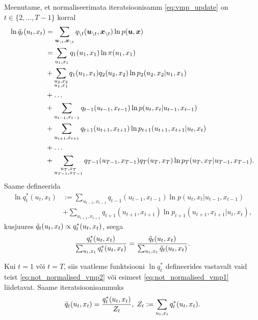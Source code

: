Meenutame, et normaliseerimata iteratsioonisamm \eqref{eq:vmp_update} on $t\in \{2,\ldots,T-1\}$ korral
\begin{align*}
    \ln \Tilde{q}_t(u_t,x_t) &= \sum_{\bm{u}_{\setminus t}, \bm{x}_{\setminus t}} q_{\setminus t}(\bm{u}_{\setminus t}, \bm{x}_{\setminus t}) \ln p(\bm{u}, \bm{x}) \\
    &= \sum_{u_1,x_1} q_{1}(u_1,x_1) \ln \pi(u_1,x_1) \\
    &+ \sum_{\substack{u_{2}, x_2 \\ u_{1}, x_{1}}} q_{1}(u_{1},x_{1})q_2(u_2,x_2) \ln p_2 (u_2,x_2|u_{1},x_{1})\\
    &+\ldots\\
    &+ \sum_{u_{t-1},x_{t-1}}q_{t-1}(u_{t-1}, x_{t-1}) \ln p(u_{t},x _t|u_{t-1}, x_{t-1})\\
    &+ \sum_{u_{t+1},x_{t+1}} q_{t+1}(u_{t+1},x_{t+1}) \ln p_{t+1}(u_{t+1},x_{t+1}|u_t,x_t)\\
    &+ \ldots\\
    &+ \sum_{\substack{u_{T}, x_T \\ u_{T-1}, x_{T-1}}} q_{T-1}(u_{T-1},x_{T-1})q_T(u_T,x_T) \ln p_T(u_T,x_T|u_{T-1},x_{T-1}).
\end{align*}
Saame defineerida
\begin{align}
\label{eq:not_normalised_vmp1}
\ln q_t^*(u_t,x_t)&:= \sum_{u_{t-1},x_{t-1}}q_{t-1}(u_{t-1}, x_{t-1})\ln p(u_{t},x_t|u_{t-1}, x_{t-1}) \\
\label{eq:not_normalised_vmp2}
&+ \sum_{u_{t+1},x_{t+1}} q_{t+1}(u_{t+1},x_{t+1})\ln p_{t+1}(u_{t+1},x_{t+1}|u_t,x_t),
\end{align}
kusjuures $\Tilde{q}_t(u_t,x_t) \propto q_t^*(u_t,x_t)$, seega
$$\frac{ q_t^*(u_t,x_t)}{\sum_{u_t,x_t} q_t^*(u_t,x_t)} = \frac{ \Tilde{q}_t(u_t,x_t)}{\sum_{u_t,x_t} \Tilde{q}_t(u_t,x_t)}.$$

Kui $t=1$ või $t=T$, siis vaatleme funktsiooni $\ln q_t^*$ defineerides vastavalt vaid teist \eqref{eq:not_normalised_vmp2} või esimest \eqref{eq:not_normalised_vmp1} liidetavat. Saame iteratsioonisammuks
\begin{equation}
    \label{eq:vmp_implement}
    \Bar{q}_t(u_t,x_t) = \frac{ q_t^*(u_t,x_t)}{Z_t}, \; Z_t := \sum_{u_t,x_t} q_t^*(u_t,x_t).
\end{equation}



